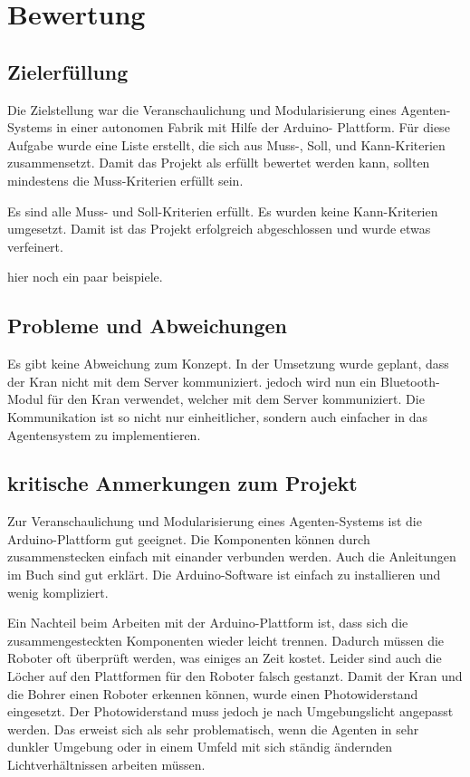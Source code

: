 \chapter{Bewertung}


\section{Zielerfüllung}

Die Zielstellung war die Veranschaulichung und Modularisierung eines Agenten-Systems in einer autonomen Fabrik mit Hilfe der Arduino- Plattform. Für diese Aufgabe wurde eine Liste erstellt, die sich aus Muss-, Soll, und Kann-Kriterien zusammensetzt. Damit das Projekt als erfüllt bewertet werden kann, sollten mindestens die Muss-Kriterien erfüllt sein.

Es sind alle Muss- und Soll-Kriterien erfüllt. Es wurden keine Kann-Kriterien umgesetzt. Damit ist das Projekt erfolgreich abgeschlossen und wurde etwas verfeinert.

hier noch ein paar beispiele.

\section{Probleme und Abweichungen}

Es gibt keine Abweichung zum Konzept. In der Umsetzung wurde geplant, dass der Kran nicht mit dem Server kommuniziert. jedoch wird nun ein Bluetooth-Modul für den Kran verwendet, welcher mit dem Server kommuniziert. Die Kommunikation ist so nicht nur einheitlicher, sondern auch einfacher in das Agentensystem zu implementieren.

\section{kritische Anmerkungen zum Projekt}

Zur Veranschaulichung und Modularisierung eines Agenten-Systems ist die Arduino-Plattform gut geeignet. Die Komponenten können durch zusammenstecken einfach mit einander verbunden werden. Auch die Anleitungen im Buch sind gut erklärt. Die Arduino-Software ist einfach zu installieren und wenig kompliziert. 

Ein Nachteil beim Arbeiten mit der Arduino-Plattform ist, dass sich die zusammengesteckten Komponenten wieder leicht trennen. Dadurch müssen die Roboter oft überprüft werden, was einiges an Zeit kostet. Leider sind auch die Löcher auf den Plattformen für den Roboter falsch gestanzt. Damit der Kran und die Bohrer einen Roboter erkennen können, wurde einen Photowiderstand eingesetzt. Der Photowiderstand muss jedoch je nach Umgebungslicht angepasst werden. Das erweist sich als sehr problematisch, wenn die Agenten in sehr dunkler Umgebung oder in einem Umfeld mit sich ständig ändernden Lichtverhältnissen arbeiten müssen. 

